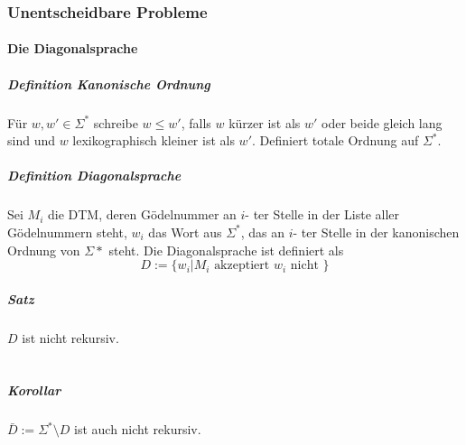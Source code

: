 \documentclass[fleqn]{scrartcl}
\begin{document}
\subsubsection{Unentscheidbare Probleme}
\paragraph{Die Diagonalsprache}
\subparagraph{Definition Kanonische Ordnung} Für $w, w' \in \Sigma^*$ schreibe $w \leq w'$, falls $w$ kürzer ist als $w'$ oder beide gleich lang sind und $w$ lexikographisch kleiner ist als $w'$. Definiert totale Ordnung auf $\Sigma^*$.
\subparagraph{Definition Diagonalsprache} Sei $M_i$ die DTM, deren Gödelnummer an $i$- ter Stelle in der Liste aller Gödelnummern steht, $w_i$ das Wort aus $\Sigma^*$, das an  $i$- ter Stelle in der kanonischen Ordnung von $\Sigma*$ steht. Die Diagonalsprache ist definiert als
\[D := \{w_i | M_i \text{ akzeptiert } w_i \text{ nicht }\}\]
\subparagraph{Satz} $D$ ist nicht rekursiv.\\\\
%
\subparagraph{Korollar} $\bar{D} := \Sigma^* \setminus D$ ist auch nicht rekursiv.\\
%
\end{document}
